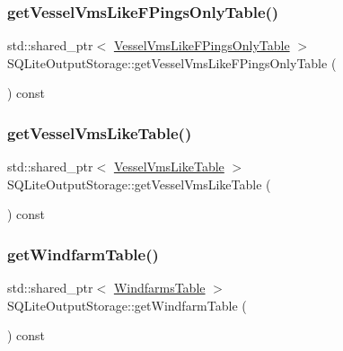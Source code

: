\subsubsection{\texorpdfstring{getVesselVmsLikeFPingsOnlyTable()}{getVesselVmsLikeFPingsOnlyTable()}}
{\footnotesize\ttfamily std\+::shared\+\_\+ptr$<$ \mbox{\hyperlink{class_vessel_vms_like_f_pings_only_table}{Vessel\+Vms\+Like\+F\+Pings\+Only\+Table}} $>$ S\+Q\+Lite\+Output\+Storage\+::get\+Vessel\+Vms\+Like\+F\+Pings\+Only\+Table (\begin{DoxyParamCaption}{ }\end{DoxyParamCaption}) const}

\mbox{\label{class_s_q_lite_output_storage_a228a4768d65e3363df180d8b9e556696}} 
\subsubsection{\texorpdfstring{getVesselVmsLikeTable()}{getVesselVmsLikeTable()}}
{\footnotesize\ttfamily std\+::shared\+\_\+ptr$<$ \mbox{\hyperlink{class_vessel_vms_like_table}{Vessel\+Vms\+Like\+Table}} $>$ S\+Q\+Lite\+Output\+Storage\+::get\+Vessel\+Vms\+Like\+Table (\begin{DoxyParamCaption}{ }\end{DoxyParamCaption}) const}

\mbox{\label{class_s_q_lite_output_storage_a60df9d35d3dfb8b5be5d6825d599ac0a}} 
\subsubsection{\texorpdfstring{getWindfarmTable()}{getWindfarmTable()}}
{\footnotesize\ttfamily std\+::shared\+\_\+ptr$<$ \mbox{\hyperlink{class_windfarms_table}{Windfarms\+Table}} $>$ S\+Q\+Lite\+Output\+Storage\+::get\+Windfarm\+Table (\begin{DoxyParamCaption}{ }\end{DoxyParamCaption}) const}

\mbox{\label{class_s_q_lite_output_storage_a90df0d3b8e9c4ddbd6e899160403a14e}} 

